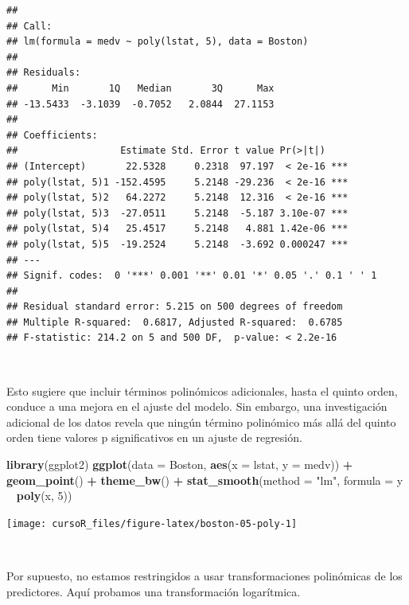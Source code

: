 \documentclass[]{book}
\newenvironment{Shaded}{\begin{snugshade}}{\end{snugshade}}
\newcommand{\KeywordTok}[1]{\textcolor[rgb]{0.13,0.29,0.53}{\textbf{#1}}}
\newcommand{\DataTypeTok}[1]{\textcolor[rgb]{0.13,0.29,0.53}{#1}}
\newcommand{\DecValTok}[1]{\textcolor[rgb]{0.00,0.00,0.81}{#1}}
\newcommand{\StringTok}[1]{\textcolor[rgb]{0.31,0.60,0.02}{#1}}
\newcommand{\OperatorTok}[1]{\textcolor[rgb]{0.81,0.36,0.00}{\textbf{#1}}}
\newcommand{\NormalTok}[1]{#1}
\begin{document}
\begin{verbatim}
## 
## Call:
## lm(formula = medv ~ poly(lstat, 5), data = Boston)
## 
## Residuals:
##      Min       1Q   Median       3Q      Max 
## -13.5433  -3.1039  -0.7052   2.0844  27.1153 
## 
## Coefficients:
##                  Estimate Std. Error t value Pr(>|t|)    
## (Intercept)       22.5328     0.2318  97.197  < 2e-16 ***
## poly(lstat, 5)1 -152.4595     5.2148 -29.236  < 2e-16 ***
## poly(lstat, 5)2   64.2272     5.2148  12.316  < 2e-16 ***
## poly(lstat, 5)3  -27.0511     5.2148  -5.187 3.10e-07 ***
## poly(lstat, 5)4   25.4517     5.2148   4.881 1.42e-06 ***
## poly(lstat, 5)5  -19.2524     5.2148  -3.692 0.000247 ***
## ---
## Signif. codes:  0 '***' 0.001 '**' 0.01 '*' 0.05 '.' 0.1 ' ' 1
## 
## Residual standard error: 5.215 on 500 degrees of freedom
## Multiple R-squared:  0.6817, Adjusted R-squared:  0.6785 
## F-statistic: 214.2 on 5 and 500 DF,  p-value: < 2.2e-16
\end{verbatim}

~

Esto sugiere que incluir términos polinómicos adicionales, hasta el
quinto orden, conduce a una mejora en el ajuste del modelo. Sin embargo,
una investigación adicional de los datos revela que ningún término
polinómico más allá del quinto orden tiene valores p significativos en
un ajuste de regresión.

\begin{Shaded}
\begin{Highlighting}[]
\KeywordTok{library}\NormalTok{(ggplot2)}
\KeywordTok{ggplot}\NormalTok{(}\DataTypeTok{data =}\NormalTok{ Boston, }\KeywordTok{aes}\NormalTok{(}\DataTypeTok{x =}\NormalTok{ lstat, }\DataTypeTok{y =}\NormalTok{ medv)) }\OperatorTok{+}\StringTok{ }
\StringTok{  }\KeywordTok{geom_point}\NormalTok{() }\OperatorTok{+}\StringTok{ }
\StringTok{  }\KeywordTok{theme_bw}\NormalTok{() }\OperatorTok{+}\StringTok{ }
\StringTok{  }\KeywordTok{stat_smooth}\NormalTok{(}\DataTypeTok{method =} \StringTok{"lm"}\NormalTok{, }\DataTypeTok{formula =}\NormalTok{ y }\OperatorTok{~}\StringTok{ }\KeywordTok{poly}\NormalTok{(x, }\DecValTok{5}\NormalTok{))}
\end{Highlighting}
\end{Shaded}

\begin{center}\texttt{[image: cursoR\_files/figure-latex/boston-05-poly-1]} \end{center}

~

Por supuesto, no estamos restringidos a usar transformaciones
polinómicas de los predictores. Aquí probamos una transformación
logarítmica.
\end{document}
